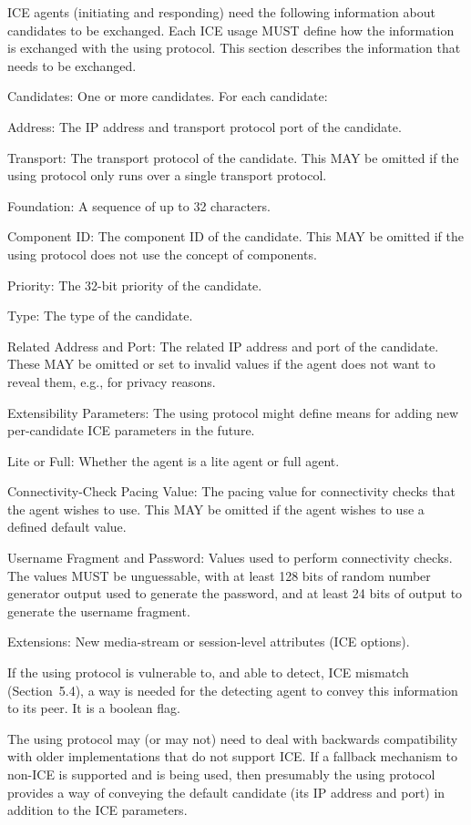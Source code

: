 \documentclass{article}
\begin{document}
ICE agents (initiating and responding) need the following information about candidates to be exchanged.  Each ICE usage MUST define how the information is exchanged with the using protocol.  This section describes the information that needs to be exchanged.

Candidates:   One or more candidates.  For each candidate:

Address:  The IP address and transport protocol port of the candidate.

Transport:  The transport protocol of the candidate.  This MAY be omitted if the using protocol only runs over a single transport protocol.

Foundation:  A sequence of up to 32 characters.

Component ID:  The component ID of the candidate.  This MAY be omitted if the using protocol does not use the concept of components.

Priority:  The 32-bit priority of the candidate.

Type:  The type of the candidate.

Related Address and Port:  The related IP address and port of the candidate.  These MAY be omitted or set to invalid values if the agent does not want to reveal them, e.g., for privacy reasons.

Extensibility Parameters:  The using protocol might define means for adding new per-candidate ICE parameters in the future.

Lite or Full:   Whether the agent is a lite agent or full agent.

Connectivity-Check Pacing Value:  The pacing value for connectivity checks that the agent wishes to use.  This MAY be omitted if the agent wishes to use a defined default value.

Username Fragment and Password:  Values used to perform connectivity checks.  The values MUST be unguessable, with at least 128 bits of random number generator output used to generate the password, and at least 24 bits of output to generate the username fragment.

Extensions:  New media-stream or session-level attributes (ICE options).

If the using protocol is vulnerable to, and able to detect, ICE mismatch (Section~5.4), a way is needed for the detecting agent to convey this information to its peer.  It is a boolean flag.

The using protocol may (or may not) need to deal with backwards compatibility with older implementations that do not support ICE.  If a fallback mechanism to non-ICE is supported and is being used, then presumably the using protocol provides a way of conveying the default candidate (its IP address and port) in addition to the ICE parameters.
\end{document}
